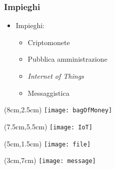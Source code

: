 \begin{frame}
  \frametitle{Impieghi}

  \begin{itemize}
   \item<1-> Impieghi:
   \begin{itemize}
    \item Criptomonete
    \item Pubblica amministrazione
    \item \textit{Internet of Things}
    \item Messaggistica
   \end{itemize}
  \end{itemize}

 \begin{textblock*}{5cm}(8cm,2.5cm)
  \texttt{[image: bagOfMoney]}
 \end{textblock*}

 \begin{textblock*}{5cm}(7.5cm,5.5cm)
  \texttt{[image: IoT]}
 \end{textblock*}

 \begin{textblock*}{5cm}(5cm,1.5cm)
  \texttt{[image: file]}
 \end{textblock*}

 \begin{textblock*}{5cm}(3cm,7cm)
  \texttt{[image: message]}
 \end{textblock*}

\end{frame}
